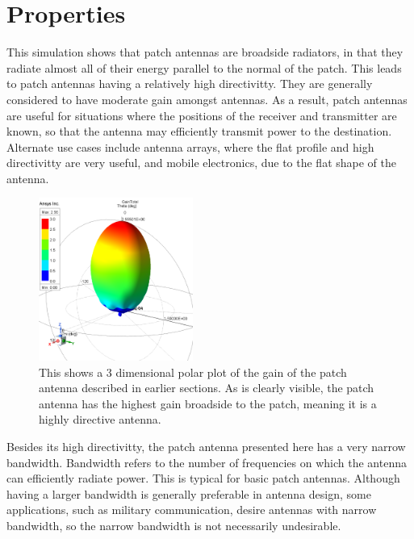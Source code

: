 \documentclass[12pt]{article}
\begin{document}
\section{Properties}

This simulation shows that patch antennas are broadside radiators, in that they radiate almost all of their energy parallel to the normal of the patch. This leads to patch antennas having a relatively high directivitty. They are generally considered to have moderate gain amongst antennas\cite{khan2015microstrip}. As a result, patch antennas are useful for situations where the positions of the receiver and transmitter are known, so that the antenna may efficiently transmit power to the destination. Alternate use cases include antenna arrays, where the flat profile and high directivitty are very useful, and mobile electronics, due to the flat shape of the antenna. 
\newpage
\begin{figure}[h]
    \centering
    \includegraphics[width=0.45\textwidth]{basic-patch-antenna-gain.png}
    \caption{This shows a 3 dimensional polar plot of the gain of the patch antenna described in earlier sections. As is clearly visible, the patch antenna has the highest gain broadside to the patch, meaning it is a highly directive antenna.}
\end{figure}

Besides its high directivitty, the patch antenna presented here has a very narrow bandwidth. Bandwidth refers to the number of frequencies on which the antenna can efficiently radiate power. This is typical for basic patch antennas\cite{balanis2016antenna}. Although having a larger bandwidth is generally preferable in antenna design, some applications, such as military communication, desire antennas with narrow bandwidth\cite{balanis2016antenna}, so the narrow bandwidth is not necessarily undesirable.
\end{document}
